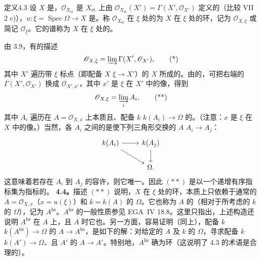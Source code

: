 \begin{SGAresult}{定义}{4.3}
设 $X$ 是，$\mathscr O_{X_{\text{ét}}}$ 是 $X_{\text{ét}}$ 上由 $\mathscr O_{X_{\text{ét}}}(X')=\Gamma(X',\mathscr O_{X'})$ 定义的（比较 VII 2 c)），$u:\xi=\operatorname{Spec}\Omega\to X$ 是。称 $\mathscr O_{X_{\text{ét}}}$ 在 $\xi$ 处的为 $X$ 在 $\xi$ 处的环，记为 $\mathscr O_{X,\xi}$ 或简记 $\mathscr O_\xi$。它的谱称为 $X$ 在 $\xi$ 处的。
\end{SGAresult}
由 3.9，有的描述
\[\mathscr O_{X,\xi}=\varinjlim\Gamma(X',\mathscr O_{X'}),\tag{*}\]
其中 $X'$ 遍历带 $\xi$ 标点（即配备 $X$  $\xi\to X'$）的 $X$ 所成的。由的，可把右端的 $\Gamma(X',\mathscr O_{X'})$ 换成 $\mathscr O_{X',x'}$，其中 $x'$ 是 $\xi$ 在 $X'$ 中的像，得到
\[\mathscr O_{X,\xi}=\varinjlim_i A_i,\tag{**}\]
其中 $A_i$ 遍历在 $A=\mathscr O_{X,x}$ 上本质且、配备 $k$  $k(A_i)\to\Omega$ 的。（注意：$x$ 是 $\xi$ 在 $X$ 中的像。）当然，各 $A_i$ 之间的是使下列三角形交换的 $A$  $A_i\to A_j$：
\[\begin{tikzcd}k(A_i)\arrow[r]\arrow[dr]&k(A_j)\arrow[d]\\&\Omega.\end{tikzcd}\]
这意味着若存在 $A_i$ 到 $A_j$ 的容许，则它唯一。因此 $(**)$ 是以一个递增有序指标集为指标的。
\textbf{4.4。}描述 $(**)$ 说明，$X$ 在 $\xi$ 处的环，本质上只依赖于通常的 $A=\mathscr O_{X,x}$（$x=u(\xi)$）和 $k=k(A)$ 的 $\Omega$。它也称为 $A$ 的（相对于所考虑的 $k$ 的 $\Omega$），记为 $A^{\mathrm{hs}}$。$A^{\mathrm{hs}}$ 的一般性质参见 EGA~IV 18.8。这里只指出，上述构造还说明 $A^{\mathrm{hs}}$ 在 $A$ 上，且 $A$ 时它也。另一方面，容易证明（同上），配备 $k$  $k(A^{\mathrm{hs}})\to\Omega$ 的 $A\to A^{\mathrm{hs}}$，是如下的解：对给定的 $A$ 及 $k$ 的 $\Omega$，寻求配备 $k$  $k(A')\to\Omega$、且 $A'$ 的 $A\to A'$。特别地，$A^{\mathrm{hs}}$ 确为环（这说明了 4.3 的术语是合理的）。
